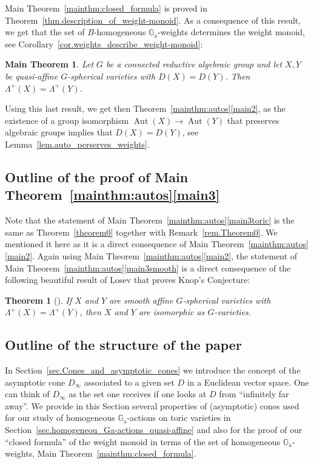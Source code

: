 \documentclass[JEP,XML,SOM,Unicode]{cedram}
\newcommand{\ra}{\mathrm{a}}
\theoremstyle{plain}
\newtheorem{maintheorem}{Main Theorem}
\newtheorem{introtheorem}{Theorem}
\theoremstyle{definition}
\DeclareMathOperator{\Aut}{Aut}
\newcommand{\GG}{\mathbb{G}}
\newcommand{\name}[1]{#1}
\begin{document}
Main Theorem~\ref{mainthm:closed_formula} is proved in Theorem~\ref{thm.description_of_weight-monoid}.
As a consequence of this result, we get that the set of $B$-homogeneous $\GG_\ra$-weights
determines the weight monoid, see Corollary~\ref{cor.weights_describe_weight-monoid}:

\begin{maintheorem}
\label{main_weight_monoid}
Let $G$ be a connected reductive algebraic group and let
$X, Y$ be quasi-affine $G$-spherical varieties with $D(X) = D(Y)$. Then $\Lambda^+(X) = \Lambda^+(Y)$.
\end{maintheorem}

Using this last result, we get then Theorem~\ref{mainthm:autos}\eqref{main2},
as the existence of a group isomorphism $\Aut(X) \to \Aut(Y)$ that preserves algebraic groups
implies that $D(X) = D(Y)$, see Lemma~\ref{lem.auto_perserves_weights}.

\subsection*{Outline of the proof of Main Theorem~\ref{mainthm:autos}\eqref{main3}}
Note that the statement of Main Theorem~\ref{mainthm:autos}\eqref{main3toric} is
the same as Theorem~\ref{theorem0}
together with Remark~\ref{rem.Theorem0}. We mentioned it here as it is a
direct consequence of Main Theorem~\ref{mainthm:autos}\eqref{main2}.
Again using Main Theorem~\ref{mainthm:autos}\eqref{main2},
the statement of Main Theorem~\ref{mainthm:autos}\eqref{main3smooth} is a direct
consequence of the following beautiful result of \name{Losev}
that proves \name{Knop}'s Conjecture:

\begin{introtheorem}[{\cite[Th.\,1.3]{Lo2009Proof-of-the-Knop-}}]
\label{thm.losev}
If $X$ and $Y$ are smooth affine $G$-spherical varieties with $\Lambda^+(X) = \Lambda^+(Y)$,
then $X$ and $Y$ are isomorphic as $G$-varieties.
\end{introtheorem}

\subsection*{Outline of the structure of the paper }
In Section~\ref{sec.Cones_and_asymptotic_cones} we introduce the concept of the
asymptotic cone $D_{\infty}$ associated to a given set $D$ in a Euclidean vector space.
One can think of $D_{\infty}$ as the set one receives if one looks at $D$ from
``infinitely far away''. We provide in this Section several properties of (asymptotic) cones used
for our study of homogeneous $\GG_\ra$-actions on toric varieties in Section~\ref{sec.homogeneou_Ga-actions_quasi-affine} and also for the proof of
our ``closed formula'' of the weight monoid in terms of the set of homogeneous $\GG_\ra$-weights,
\ie Main Theorem~\ref{mainthm:closed_formula}.
\end{document}
